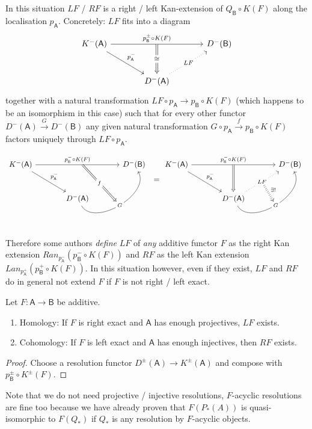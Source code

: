\documentclass[fontsize=11pt,fleqn,a4paper]{scrartcl}
\begin{document}
\begin{remark}
In this situation $LF$ / $RF$ is a right / left Kan-extension of $Q_\mathsf{B}\circ K(F)$ along the localisation $p_\mathsf{A}$. Concretely: $LF$ fits into a diagram
\[\begin{tikzcd}[sep = large]
K^-(\mathsf{A}) \ar[rr,"p_\mathsf{B}^\pm\circ K(F)"{name=top_arrow}] \ar[dr,"p_\mathsf{A}^-"] && D^-(\mathsf{B}) \\
 & D^-(\mathsf{A}) \ar[ur,dotted,"LF"{name=LF, description}] \ar[from=top_arrow,Rightarrow,"\isomorphic" description]
\end{tikzcd}\]
together with a natural transformation $LF \circ p_\mathsf{A} \to p_\mathsf{B} \circ K(F)$ (which happens to be an isomorphism in this case) such that for every other functor $D^-(\mathsf{A}) \xrightarrow{G} D^-(\mathsf{B})$ any given natural transformation $G \circ p_\mathsf{A} \xrightarrow{f} p_\mathsf{B} \circ K(F)$ factors uniquely through $LF\circ p_\mathsf{A}$.

\[\begin{tikzcd}[sep = large]
K^-(\mathsf{A}) \ar[rr,"p_\mathsf{B}^-\circ K(F)"{name=top_arrow}] \ar[dr,"p_\mathsf{A}^-"] && D^-(\mathsf{B}) \\
 & D^-(\mathsf{A}) \ar[ur,bend right=90,"G"{name=G, description}]
\arrow[from=top_arrow,to=G, Rightarrow,"f" description]
\end{tikzcd}
=
\begin{tikzcd}[sep = large]
K^-(\mathsf{A}) \ar[rr,"p_\mathsf{B}^-\circ K(F)"{name=top_arrow}] \ar[dr,"p_\mathsf{A}^-"] && D^-(\mathsf{B}) \\
 & D^-(\mathsf{A}) \ar[ur,dotted,"LF"{name=LF, description}] \ar[ur,bend right=90,"G"{name=G,description}] \ar[from=top_arrow,Rightarrow]
\arrow[Rightarrow,dotted, from=LF, to=G,"\exists!"]
\end{tikzcd}\]

Therefore some authors \emph{define} $LF$ of \emph{any} additive functor $F$ as the right Kan extension $Ran_{p_\mathsf{A}^-}( p_\mathsf{B}^- \circ K(F))$ and $RF$ as the left Kan extension $Lan_{p_\mathsf{A}^+}(p_\mathsf{B}^+\circ K(F))$. In this situation however, even if they exist, $LF$ and $RF$ do in general not extend $F$ if $F$ is not right / left exact.
\end{remark}

\begin{theorem}
Let $F:\mathsf{A}\to\mathsf{B}$ be additive.
\begin{enumerate}
\item Homology: If $F$ is right exact and $\mathsf{A}$ has enough projectives, $LF$ exists.
\item Cohomology: If $F$ is left exact and $\mathsf{A}$ has enough injectives, then $RF$ exists.
\end{enumerate}
\end{theorem}
\begin{proof}
Choose a resolution functor $D^\pm(\mathsf{A}) \to K^\pm(\mathsf{A})$ and compose with $p_\mathsf{B}^\pm\circ K^\pm(F)$.
\end{proof}

\begin{remark}
Note that we do not need projective / injective resolutions, $F$-acyclic resolutions are fine too because we have already proven that $F(P_\ast(A))$ is quasi-isomorphic to $F(Q_\ast)$ if $Q_\ast$ is any resolution by $F$-acyclic objects.
\end{remark}
\end{document}
